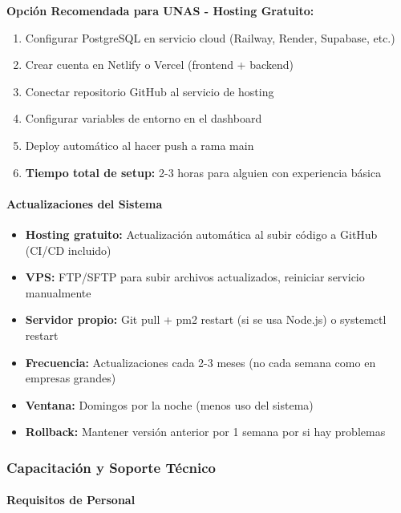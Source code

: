 \documentclass[12pt,a4paper]{article}
\begin{document}
\textbf{Opción Recomendada para UNAS - Hosting Gratuito:}
\begin{enumerate}[noitemsep]
    \item Configurar PostgreSQL en servicio cloud (Railway, Render, Supabase, etc.)
    \item Crear cuenta en Netlify o Vercel (frontend + backend)
    \item Conectar repositorio GitHub al servicio de hosting
    \item Configurar variables de entorno en el dashboard
    \item Deploy automático al hacer push a rama main
    \item \textbf{Tiempo total de setup:} 2-3 horas para alguien con experiencia básica
\end{enumerate}

\paragraph{Actualizaciones del Sistema}

\begin{itemize}[noitemsep]
    \item \textbf{Hosting gratuito:} Actualización automática al subir código a GitHub (CI/CD incluido)
    \item \textbf{VPS:} FTP/SFTP para subir archivos actualizados, reiniciar servicio manualmente
    \item \textbf{Servidor propio:} Git pull + pm2 restart (si se usa Node.js) o systemctl restart
    \item \textbf{Frecuencia:} Actualizaciones cada 2-3 meses (no cada semana como en empresas grandes)
    \item \textbf{Ventana:} Domingos por la noche (menos uso del sistema)
    \item \textbf{Rollback:} Mantener versión anterior por 1 semana por si hay problemas
\end{itemize}

\subsubsection{Capacitación y Soporte Técnico}

\paragraph{Requisitos de Personal}
\end{document}
